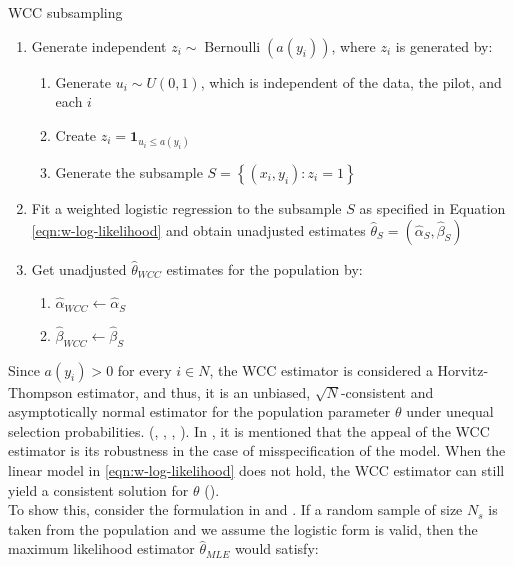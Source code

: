 \begin{algorithm}[ht]
  \caption{WCC subsampling}
  \begin{enumerate}
    \item 
    Generate independent $z_i \sim \operatorname{Bernoulli}\left(a\left(y_i\right)\right)$, where $z_i$ is generated by:
    \begin{enumerate}
      \item 
      Generate $u_i \sim U(0,1)$, which is independent of the data, the pilot, and each $i$
      \item 
      Create $z_i=\mathbf{1}_{u_i \leq a\left(y_i\right)}$
      \item Generate the subsample $S=\left\{\left(x_i, y_i\right): z_i=1\right\}$ 
    \end{enumerate}
    \item 
    Fit a weighted logistic regression to the subsample $S$ as specified in Equation \ref{eqn:w-log-likelihood} and obtain unadjusted estimates $\hat{\theta}_{S}=(\hat{\alpha}_{S}, \hat{\beta}_{S})$
    \item
    Get unadjusted $\widehat{\theta}_{WCC}$ estimates for the population by:
    \begin{enumerate}
        \item $\hat{\alpha}_{WCC} \leftarrow \hat{\alpha}_{S}$
        \item $\hat{\beta}_{WCC} \leftarrow \hat{\beta}_{S}$
    \end{enumerate}
  \end{enumerate}
  \label{alg:alg_wcc}
\end{algorithm}


Since $a(y_i) > 0$ for every $i \in N$, the WCC estimator is considered a Horvitz-Thompson estimator, and thus, it is an unbiased, $\sqrt{N}$-consistent and asymptotically normal estimator for the population parameter $\theta$ under unequal selection probabilities. (\cite{manski1977estimation}, \cite{scott2002}, \cite{hastie2014}, \cite{overton1995horvitz}). In \textcite{scott2002}, it is mentioned that the appeal of the WCC estimator is its robustness in the case of misspecification of the model. When the linear model in \ref{eqn:w-log-likelihood} does not hold, the WCC estimator can still yield a consistent solution for $\theta$ (\cite{scott2002}). \\

To show this, consider the formulation in \textcite{scott1986} and \textcite{scott2002}. If a random sample of size $N_s$ is taken from the population and we assume the logistic form is valid, then the maximum likelihood estimator $\hat{\theta}_{MLE}$ would satisfy:

